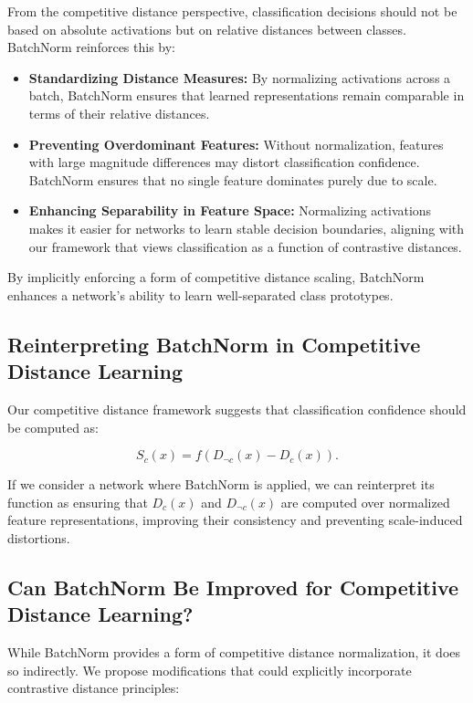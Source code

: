 From the competitive distance perspective, classification decisions should not be based on absolute activations but on relative distances between classes. BatchNorm reinforces this by:

\begin{itemize}
    \item \textbf{Standardizing Distance Measures:} By normalizing activations across a batch, BatchNorm ensures that learned representations remain comparable in terms of their relative distances.
    \item \textbf{Preventing Overdominant Features:} Without normalization, features with large magnitude differences may distort classification confidence. BatchNorm ensures that no single feature dominates purely due to scale.
    \item \textbf{Enhancing Separability in Feature Space:} Normalizing activations makes it easier for networks to learn stable decision boundaries, aligning with our framework that views classification as a function of contrastive distances.
\end{itemize}

By implicitly enforcing a form of competitive distance scaling, BatchNorm enhances a network's ability to learn well-separated class prototypes.

\subsection{Reinterpreting BatchNorm in Competitive Distance Learning}

Our competitive distance framework suggests that classification confidence should be computed as:

\[
S_c(x) = f(D_{\neg c}(x) - D_c(x)).
\]

If we consider a network where BatchNorm is applied, we can reinterpret its function as ensuring that \( D_c(x) \) and \( D_{\neg c}(x) \) are computed over normalized feature representations, improving their consistency and preventing scale-induced distortions.

\subsection{Can BatchNorm Be Improved for Competitive Distance Learning?}

While BatchNorm provides a form of competitive distance normalization, it does so indirectly. We propose modifications that could explicitly incorporate contrastive distance principles:

